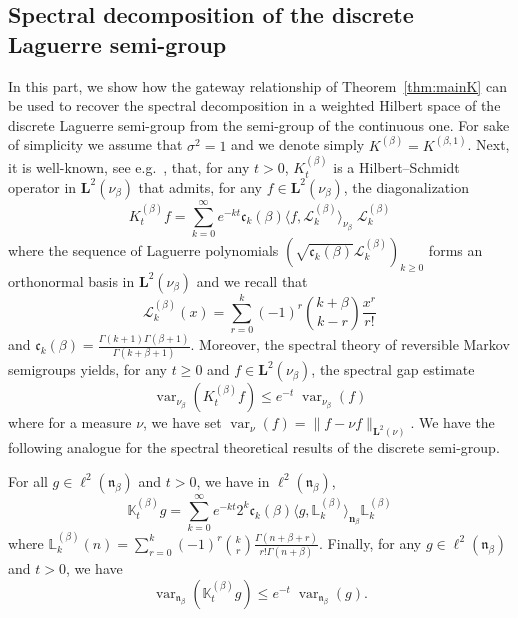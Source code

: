 \documentclass[10pt]{amsart}
\theoremstyle{definition}\newtheorem{defi}[theo]{Definition}\newtheorem{rema}[theo]{Remark}\newtheorem{exam}[theo]{Example}\newtheorem{exem}[theo]{Example}\newtheorem{nota}[theo]{Notation}
\DeclareMathOperator{\var}{var}
\newcommand{\fn}{\mathfrak{n}}
\newcommand{\Ls}{K}
\newcommand{\esL}{\mathbf{L}}
\newcommand{\esLd}{\ell}
\renewcommand{\L}{\mathbf{L}}
\newcommand{\meKp}{{\mathbf{n}_{\beta}}}
\newcommand{\discret}[1]{\mathds{#1}}
\newcommand{\cont}[1]{{#1}}
\newcommand{\Ks}{\discret{K}}
\newcommand{\eigL}{\mathbb{L}_k}
\newcommand{\Lnu}{{\L^{2}(\nu_{\beta})}}
\begin{document}
\subsection{Spectral decomposition of the discrete Laguerre semi-group} \label{sec:spect_lag}

In this part, we show how the gateway relationship of Theorem~\ref{thm:mainK} can be used to recover the spectral decomposition in a weighted Hilbert space of the discrete Laguerre semi-group from the semi-group of the continuous one. For sake of simplicity we assume that $\sigma^2=1$ and we denote simply $\Ls^{(\beta)}=\Ls^{(\beta,1)}$. Next, it is well-known, see e.g.~\cite{Bakry_Book}, that, for any $t>0$, $\Ls_t^{(\beta)}$ is a Hilbert--Schmidt operator in $\esL^2(\nu_{\beta})$ that admits, for any $f \in \esL^2(\nu_{\beta})$, the diagonalization
\begin{equation}\label{eq:seK}
\Ls^{(\beta)}_t f = \sum_{k=0}^{\infty}e^{-k t} \mathfrak{c}_{k}(\beta) \langle f, \mathcal{L}^{(\beta)}_k \rangle_{\nu_{\beta}}\; \mathcal{L}^{(\beta)}_k
\end{equation}
where the sequence of Laguerre polynomials $(\sqrt{\mathfrak{c}_{k}(\beta)}\mathcal{L}^{(\beta)}_k)_{k\geq 0}$ forms an orthonormal basis in $\esL^2(\nu_{\beta})$ and we recall that
\begin{equation*}
\mathcal{L}^{(\beta)}_k(x)=\sum_{r=0}^k (-1)^r \binom{ k +\beta}{k-r} \frac{x^r }{r!}
\end{equation*}
and $\mathfrak{c}_{k}(\beta)=\frac{\Gamma(k+1) \Gamma(\beta+1)}{\Gamma(k+\beta+1)}$. Moreover, the spectral theory of reversible Markov semigroups yields, for any $t\geq 0$ and $f\in \Lnu$, the spectral gap estimate
\begin{equation}\label{eq:inv_Lag}
\var_{\nu_{\beta}}\left(\cont{K}^{(\beta)}_tf\right)\leq e^{-t} \; \var_{\nu_{\beta}}\left(f\right)
\end{equation}
where for a measure $\nu$, we have set $\var_{\nu}\left(f\right)=\|f-\nu f\|_{\L^2(\nu)}$. We have the following analogue for the spectral theoretical results of the discrete semi-group.

\begin{prop}
For all $ g \in \esLd^2(\fn_{\beta}) $ and $t>0$, we have in $ \esLd^2(\fn_{\beta}) $,
\begin{equation*}
\Ks^{(\beta)}_t g = \sum_{k=0}^{\infty}e^{-kt}2^{k}\mathfrak{c}_{k}(\beta) \langle g, \eigL^{(\beta)} \rangle_\meKp \eigL^{(\beta)}
\end{equation*}
where $
\eigL^{(\beta)}(n)=\sum_{r=0}^{k} (-1)^r \binom{ k}{r} \frac{\Gamma(n+\beta+r)}{r! \Gamma(n+\beta)}. $ Finally, for any $ g \in \esLd^2(\fn_{\beta}) $ and $t>0$, we have
\begin{equation*}
\var_{\fn_{\beta}}\left(\discret{K}^{(\beta)}_tg \right)\leq e^{-t} \; \var_{\fn_{\beta}}\left(g\right).
\end{equation*}
\end{prop}
\end{document}
